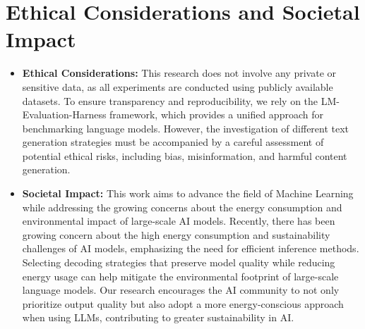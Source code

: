 \section{Ethical Considerations and Societal Impact} 

\begin{itemize}\itemsep0em 
    \item \textbf{Ethical Considerations:} This research does not involve any private or sensitive data, as all experiments are conducted using publicly available datasets. To ensure transparency and reproducibility, we rely on the LM-Evaluation-Harness framework, which provides a unified approach for benchmarking language models. However, the investigation of different text generation strategies must be accompanied by a careful assessment of potential ethical risks, including bias, misinformation, and harmful content generation.
    
    \item \textbf{Societal Impact:} This work aims to advance the field of Machine Learning while addressing the growing concerns about the energy consumption and environmental impact of large-scale AI models. Recently, there has been growing concern about the high energy consumption and sustainability challenges of AI models, emphasizing the need for efficient inference methods. Selecting decoding strategies that preserve model quality while reducing energy usage can help mitigate the environmental footprint of large-scale language models. Our research encourages the AI community to not only prioritize output quality but also adopt a more energy-conscious approach when using LLMs, contributing to greater sustainability in AI.
\end{itemize}